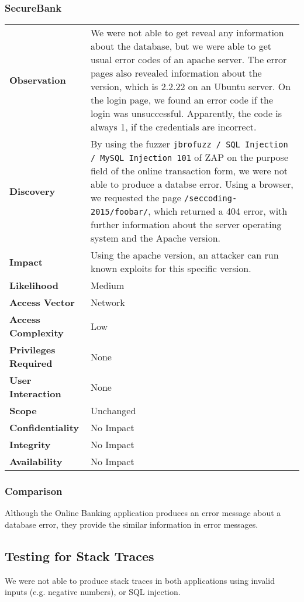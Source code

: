 \subsubsection*{SecureBank}
\begin{tabular}{l|p{10cm}}

\textbf{Observation} & We were not able to get reveal any information about the database, but we were able to get usual error codes of an apache server. The error pages also revealed information about the version, which is 2.2.22 on an Ubuntu server. On the login page, we found an error code if the login was unsuccessful. Apparently, the code is always 1, if the credentials are incorrect. \\
\textbf{Discovery} & By using the fuzzer \texttt{jbrofuzz / SQL Injection / MySQL Injection 101} of ZAP on the purpose field of the online transaction form, we were not able to produce a databse error. Using a browser, we requested the page \texttt{/seccoding-2015/foobar/}, which returned a 404 error, with further information about the server operating system and the Apache version. \\
\textbf{Impact} & Using the apache version, an attacker can run known exploits for this specific version. \\
\textbf{Likelihood} & Medium \\
\textbf{Access Vector} & Network \\
\textbf{Access Complexity} & Low \\
\textbf{Privileges Required} & None \\
\textbf{User Interaction} & None \\
\textbf{Scope} & Unchanged \\
\textbf{Confidentiality} & No Impact \\
\textbf{Integrity} & No Impact \\
\textbf{Availability} & No Impact \\
\end{tabular}

\subsubsection*{Comparison}
Although the Online Banking application produces an error message about a database error, they provide the similar information in error messages.

\subsection{Testing for Stack Traces}
We were not able to produce stack traces in both applications using invalid inputs (e.g. negative numbers), or SQL injection.

